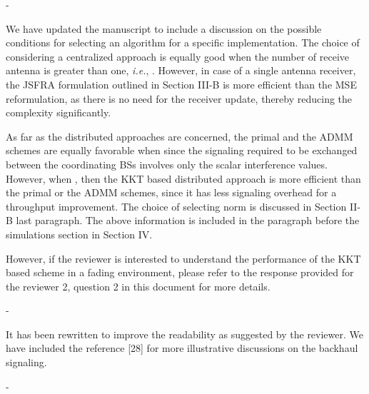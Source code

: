 \begin{enumerate}
\begin{enumerate}
	 - 
	
	\resp We have updated the manuscript to include a discussion on the possible conditions for selecting an algorithm for a specific implementation. The choice of considering a centralized approach is equally good when the number of receive antenna is greater than one, \textit{i.e.}, . However, in case of a single antenna receiver, the \ac{JSFRA} formulation outlined in Section III-B is more efficient than the \ac{MSE} reformulation, as there is no need for the receiver update, thereby reducing the complexity significantly. 
	
	As far as the distributed approaches are concerned, the primal and the \ac{ADMM} schemes are equally favorable when  since the signaling required to be exchanged between the coordinating \acp{BS} involves only the scalar interference values. However, when , then the \ac{KKT} based distributed approach is more efficient than the primal or the \ac{ADMM} schemes, since it has less signaling overhead for a throughput improvement. The choice of selecting  norm is discussed in Section II-B last paragraph. The above information is included in the paragraph before the simulations section in Section IV.
	
	However, if the reviewer is interested to understand the performance of the \ac{KKT} based scheme in a fading environment, please refer to the response provided for the reviewer 2, question 2 in this document for more details.
	
	 - 
	
	\resp It has been rewritten to improve the readability as suggested by the reviewer. We have included the reference [28] for more illustrative discussions on the backhaul signaling.
	
	 - 
	

\end{enumerate}
\end{enumerate}
